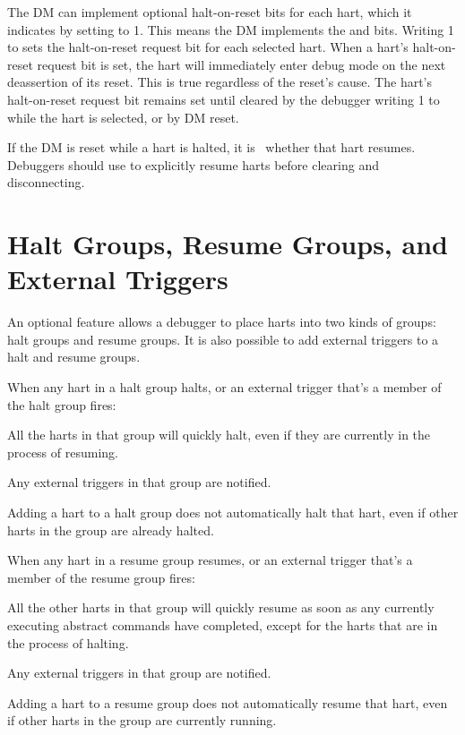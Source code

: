 The DM can implement optional halt-on-reset bits for each hart,
which it indicates by setting \FdmDmstatusHasresethaltreq to 1.
This means the DM implements the \FdmDmcontrolSetresethaltreq and \FdmDmcontrolClrresethaltreq bits.
Writing 1 to \FdmDmcontrolSetresethaltreq sets the halt-on-reset request bit for each
selected hart.
When a hart's halt-on-reset request bit is set, the hart will immediately enter
debug mode on the next deassertion of its reset. This is true regardless of
the reset's cause.
The hart's halt-on-reset request bit remains set
until cleared by the debugger writing 1 to \FdmDmcontrolClrresethaltreq
while the hart is selected, or by DM reset.

If the DM is reset while a hart is halted, it is \unspecified\ whether
that hart resumes.  Debuggers should use \FdmDmcontrolResumereq to
explicitly resume harts before clearing \FdmDmcontrolDmactive and
disconnecting.

\section{Halt Groups, Resume Groups, and External Triggers} \label{hrgroups}

An optional feature allows a debugger to place harts into two kinds of groups: halt
groups and resume groups.  It is also possible to add external triggers to a
halt and resume groups.

\begin{steps}{When any hart in a halt group halts, or an external trigger
    that's a member of the halt group fires:}
\item All the harts in that group will quickly halt, even if they are currently
    in the process of resuming.
\item Any external triggers in that group are notified.
\end{steps}
Adding a hart to a halt group does not automatically halt that hart, even if
other harts in the group are already halted.

\begin{steps}{When any hart in a resume group resumes, or an external trigger
    that's a member of the resume group fires:}
\item All the other harts in that group will quickly resume as soon as any
    currently executing abstract commands have completed, except for the harts
    that are in the process of halting.
\item Any external triggers in that group are notified.
\end{steps}
Adding a hart to a resume group does not automatically resume that hart, even
if other harts in the group are currently running.

